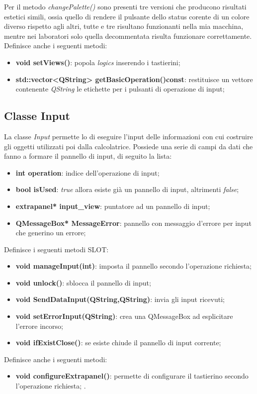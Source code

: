 \documentclass[a4paper,10pt]{article}
\begin{document}
        Per il metodo \textit{changePalette()} sono presenti tre versioni che producono risultati estetici simili, ossia quello di rendere il pulsante dello status corente di un colore diverso rispetto agli altri, tutte e tre risultano funzionanti nella mia macchina, mentre nei laboratori solo quella decommentata risulta funzionare correttamente.
        Definisce anche i seguenti metodi:
        \begin{itemize}
            \item \textbf{void setViews()}: popola \textit{logics} inserendo i tastierini;
            \item \textbf{std::vector<QString> getBasicOperation()const}: restituisce un vettore contenente \textit{QString} le etichette per i pulsanti di operazione di input;
        \end{itemize}

        \subsection{Classe Input}
        La classe \textit{Input} permette lo di eseguire l'input delle informazioni con cui costruire gli oggetti utilizzati poi dalla calcolatrice.
        Possiede una serie di campi da dati che fanno a formare il pannello di input, di seguito la lista:
        \begin{itemize}
            \item \textbf{int operation}: indice dell'operazione di input;
            \item \textbf{bool isUsed}: \textit{true} allora esiste già un pannello di input, altrimenti \textit{false};
            \item \textbf{extrapanel* input\_view}: puntatore ad un pannello di input;
            \item \textbf{QMessageBox* MessageError}: pannello con messaggio d'errore per input che generino un errore;
        \end{itemize}
        Definisce i seguenti metodi SLOT:
        \begin{itemize}
            \item \textbf{void manageInput(int)}: imposta il pannello secondo l'operazione richiesta;
            \item \textbf{void unlock()}: sblocca il pannello di input;
            \item \textbf{void SendDataInput(QString,QString)}: invia gli input ricevuti;
            \item \textbf{void setErrorInput(QString)}: crea una QMessageBox ad esplicitare l'errore incorso;
            \item \textbf{void ifExistClose()}: se esiste chiude il pannello di input corrente;
        \end{itemize}
        Definisce anche i seguenti metodi:
        \begin{itemize}
            \item \textbf{void configureExtrapanel()}: permette di configurare il tastierino secondo l'operazione richiesta;   .       
        \end{itemize}
\end{document}
